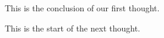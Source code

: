 \documentclass{article}
\begin{document}
This is the conclusion of our first thought.

This is the start of the next thought.
\end{document}
